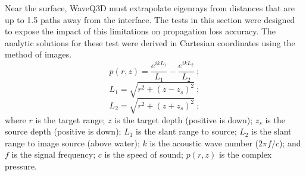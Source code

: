 \documentclass{ws-jca}
\begin{document}
Near the surface, WaveQ3D must extrapolate eigenrays from distances that
are up to 1.5 paths away from the interface. The tests in this section were
designed to expose the impact of this limitations on propagation loss
accuracy. The analytic solutions for these test were derived in Cartesian
coordinates using the method of images.
\begin{equation}
	p(r,z) = \frac{ e^{ikL_1} }{ L_1 } - \frac{ e^{ikL_2} }{ L_2 } \:;
	\label{eq:lloyd_flat_p}
\end{equation}
\begin{equation}
	L_1 = \sqrt{ r^2 + ( z - z_s )^2 } \:;
	\label{eq:lloyd_flat_l1}
\end{equation}
\begin{equation}
	L_2 = \sqrt{ r^2 + ( z + z_s )^2 } \:;
	\label{eq:lloyd_flat_l2}
\end{equation}
where
$r$ is the target range;
$z$ is the target depth (positive is down);
\( z_s \) is the source depth (positive is down);
\( L_1 \) is the slant range to source;
\( L_2 \) is the slant range to image source (above water);
$k$ is the acoustic wave number (\( 2 \pi f / c \)); and
$f$ is the signal frequency;
$c$ is the speed of sound;
\( p(r,z) \) is the complex pressure.
\end{document}
